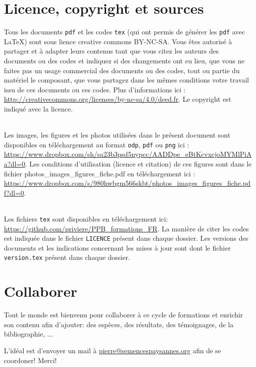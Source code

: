 \section{Licence, copyright et sources}

Tous les documents \texttt{pdf} et les codes \texttt{tex} (qui ont permis de générer les \texttt{pdf} avec \LaTeX) sont sous lience creative commons BY-NC-SA. 
Vous êtes autorisé à partager et à adapter leurs contenus tant que vous citez les auteurs des documents ou des codes et indiquez si des changements ont eu lieu, que vous ne faites pas un usage commercial des documents ou des codes, tout ou partie du matériel le composant, que vous partagez dans les mêmes conditions votre travail issu de ces documents ou ces codes. 
Plus d'informations ici : \url{http://creativecommons.org/licenses/by-nc-sa/4.0/deed.fr}.
Le copyright est indiqué avec la licence.

~\\

Les images, les figures et les photos utilisées dans le présent document sont disponibles en téléchargement au format \texttt{odp}, \texttt{pdf} ou \texttt{png} ici : \url{https://www.dropbox.com/sh/sa23b3psd5nypcc/AADDpe_eBtKcvxcjoMYMlPiAa?dl=0}.
Les conditions d'utilisation (licence et citation) de ces figures sont dans le fichier photos\_images\_figures\_fiche.pdf en téléchargement ici : \url{https://www.dropbox.com/s/980hwbgm566skbt/photos_images_figures_fiche.pdf?dl=0}.

~\\

Les fichiers \texttt{tex} sont disponibles en téléchargement ici: \url{https://github.com/priviere/PPB_formations_FR}.
La manière de citer les codes est indiquée dans le fichier \texttt{LICENCE} présent dans chaque dossier.
Les versions des documents et les indications concernant les mises à jour sont dont le fichier \texttt{version.tex} présent dans chaque dossier.


\section{Collaborer}
Tout le monde est bienvenu pour collaborer à ce cycle de formations et enrichir son contenu afin d'ajouter: 
des espèces,
des résultats,
des témoignages,
de la bibliographie, ...

L'idéal est d'envoyer un mail à \href{mailto:pierre@semencespaysannes.org}{\textcolor{mln-green} {pierre@semencespaysannes.org}} afin de se coordoner! Merci!
